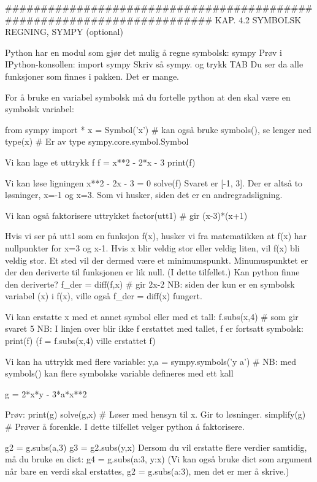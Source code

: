 ######################################################################## 
KAP. 4.2  SYMBOLSK REGNING, SYMPY  (optional)

Python har en modul som gjør det mulig å regne symbolsk: sympy
Prøv i IPython-konsollen:
import sympy
Skriv så sympy. og trykk TAB
Du ser da alle funksjoner som finnes i pakken. Det er mange.

For å bruke en variabel symbolsk må du fortelle python at den skal være en symbolsk variabel:

from sympy import *
x = Symbol('x')   # kan også bruke symbols(), se lenger ned 
type(x)           # Er av type sympy.core.symbol.Symbol

Vi kan lage et uttrykk f
f = x**2 - 2*x - 3 
print(f)

Vi kan løse ligningen x**2 - 2x - 3 = 0
solve(f)
Svaret er [-1, 3]. Der er altså to løsninger, x=-1 og x=3.
Som vi husker, siden det er en andregradsligning.

Vi kan også faktorisere uttrykket
factor(utt1)    # gir (x-3)*(x+1)

Hvis vi ser på utt1 som en funksjon f(x), husker vi fra matematikken at f(x) har nullpunkter for x=3 og x-1. 
Hvis x blir veldig stor eller veldig liten, vil f(x) bli veldig stor. 
Et sted vil der dermed være et minimumspunkt.
Minumuspunktet er der den deriverte til funksjonen er lik null. (I dette tilfellet.) 
Kan python finne den deriverte? 
f_der = diff(f,x)    # gir 2x-2
NB: siden der kun er en symbolsk variabel (x) i f(x), ville også f_der = diff(x) fungert. 

Vi kan erstatte x med et annet symbol eller med et tall:
f.subs(x,4)    # som gir svaret 5
NB: I linjen over blir ikke f erstattet med tallet, f er fortsatt symbolsk: 
print(f)
(f = f.subs(x,4) ville erstattet f)

Vi kan ha uttrykk med flere variable: 
y,a = sympy.symbols('y a')    # NB: med symbols() kan flere symbolske variable defineres med ett kall 

g = 2*x*y - 3*a*x**2

Prøv:
print(g)
solve(g,x)        # Løser med hensyn til x. Gir to løsninger. 
simplify(g)       # Prøver å forenkle. I dette tilfellet velger python å faktorisere. 

g2 = g.subs(a,3)
g3 = g2.subs(y,x)
Dersom du vil erstatte flere verdier samtidig, må du bruke en dict: 
g4 = g.subs({a:3, y:x})
(Vi kan også bruke dict som argument når bare en verdi skal erstattes, g2 = g.subs({a:3}), men det er mer å skrive.) 


